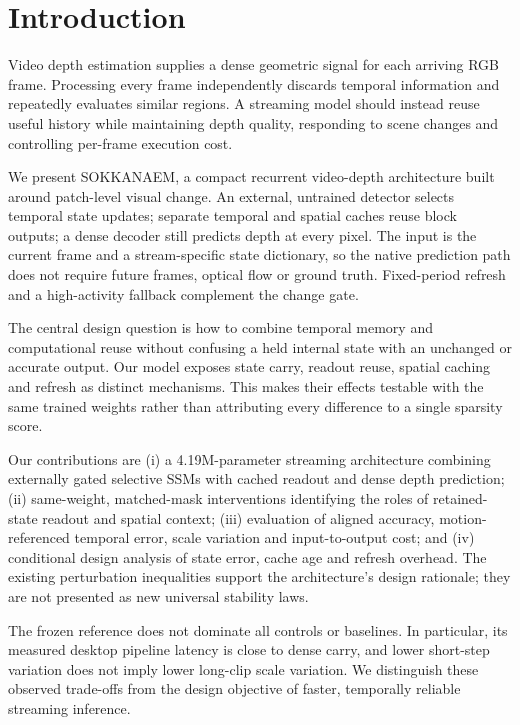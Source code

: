 \documentclass[mathematics,article,submit,moreauthors]{Definitions/mdpi}
\begin{document}
\section{Introduction}
Video depth estimation supplies a dense geometric signal for each arriving RGB frame.
Processing every frame independently discards temporal information and repeatedly evaluates
similar regions. A streaming model should instead reuse useful history while maintaining
depth quality, responding to scene changes and controlling per-frame execution cost.

We present SOKKANAEM, a compact recurrent video-depth architecture built around
patch-level visual change. An external, untrained detector selects temporal state updates;
separate temporal and spatial caches reuse block outputs; a dense decoder still predicts
depth at every pixel. The input is the current frame and a stream-specific state dictionary,
so the native prediction path does not require future frames, optical flow or ground truth.
Fixed-period refresh and a high-activity fallback complement the change gate.

The central design question is how to combine temporal memory and computational reuse
without confusing a held internal state with an unchanged or accurate output. Our model
exposes state carry, readout reuse, spatial caching and refresh as distinct mechanisms.
This makes their effects testable with the same trained weights rather than attributing
every difference to a single sparsity score.

Our contributions are (i) a 4.19M-parameter streaming architecture combining externally
gated selective SSMs with cached readout and dense depth prediction; (ii) same-weight,
matched-mask interventions identifying the roles of retained-state readout and spatial
context; (iii) evaluation of aligned accuracy, motion-referenced temporal error, scale
variation and input-to-output cost; and (iv) conditional design analysis of state error,
cache age and refresh overhead. The existing perturbation inequalities support the
architecture's design rationale; they are not presented as new universal stability laws.

The frozen reference does not dominate all controls or baselines. In particular,
its measured desktop pipeline latency is close to dense carry, and lower short-step
variation does not imply lower long-clip scale variation. We distinguish these observed
trade-offs from the design objective of faster, temporally reliable streaming inference.
\end{document}
